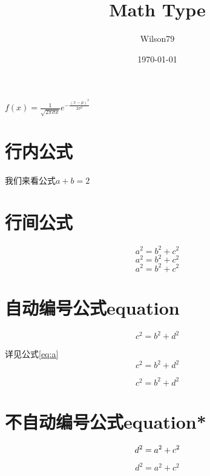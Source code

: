 \documentclass{article}
\title{Math Type}
\author{Wilson79}
\date{\today}
\begin{document}
 
\tableofcontents %
\maketitle %

    $f(x)=\frac{1}{\sqrt{2 \pi \sigma x}} e^{-\frac{(x-\mu)^{2}}{2 \sigma^{2}}}$

\section{行内公式} %

    我们来看公式$a+b=2$ %

\section{行间公式}

    \[a^2 = b ^2 + c^2 \] %
    $$a^2 = b ^2 + c^2$$
    \begin{displaymath}
    a^2 = b ^2 + c^2
    \end{displaymath}

\section{自动编号公式equation}
    \begin{equation} %
    c^2 = b ^2 + d^2 
    \end{equation}

    详见公式\ref{eq:a}
    \begin{equation} 
    c^2 = b ^2 + d^2 \label{eq:a}
    \end{equation}

    \begin{equation} 
    c^2 = b ^2 + d^2 \tag{*} 
    \end{equation}

\section{不自动编号公式equation*}  
    \begin{equation}
    d^2 = a ^2 + c^2 \notag
    \end{equation}

    \begin{equation*}
    d^2 = a ^2 + c^2 
    \end{equation*}
\end{document}
